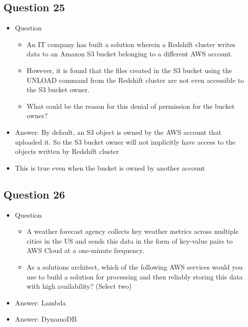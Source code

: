 \documentclass[]{scrartcl}
\begin{document}
\subsection{Question 25}
\begin{itemize}
	\item Question
	\begin{itemize}
		\item An IT company has built a solution wherein a Redshift cluster writes data to an Amazon S3 bucket belonging to a different AWS account. 
		\item However, it is found that the files created in the S3 bucket using the UNLOAD command from the Redshift cluster are not even accessible to the S3 bucket owner.
		\item What could be the reason for this denial of permission for the bucket owner?
	\end{itemize}
	\item Answer: By default, an S3 object is owned by the AWS account that uploaded it. So the S3 bucket owner will not implicitly have access to the objects written by Redshift cluster 
	\item This is true even when the bucket is owned by another account
\end{itemize}

\subsection{Question 26}
\begin{itemize}
	\item Question
	\begin{itemize}
		\item A weather forecast agency collects key weather metrics across multiple cities in the US and sends this data in the form of key-value pairs to AWS Cloud at a one-minute frequency.
		\item As a solutions architect, which of the following AWS services would you use to build a solution for processing and then reliably storing this data with high availability? (Select two)
	\end{itemize}
	\item Answer: Lambda
	\item Answer: DynamoDB
\end{itemize}
\end{document}

